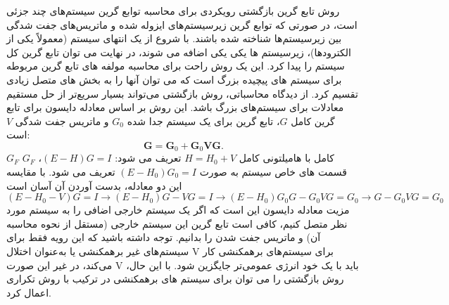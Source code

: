 روش تابع گرین بازگشتی رویکردی برای محاسبه توابع گرین سیستم‌های چند جزئی است، در صورتی که توابع گرین زیرسیستم‌های ایزوله شده و ماتریس‌های جفت شدگی بین زیرسیستم‌ها شناخته شده باشند. با شروع از یک انتهای سیستم (معمولاً یکی از الکترودها)، زیرسیستم ها یکی یکی اضافه می شوند، در نهایت می توان تابع گرین کل سیستم را پیدا کرد. این یک روش راحت برای محاسبه مولفه های تابع گرین مربوطه برای سیستم های پیچیده بزرگ است که می توان آنها را به بخش های متصل زیادی تقسیم کرد. از دیدگاه محاسباتی، روش بازگشتی می‌تواند بسیار سریع‌تر از حل مستقیم معادلات برای سیستم‌های بزرگ باشد.
این روش بر اساس معادله دایسون برای تابع گرین کامل $G$، تابع گرین برای یک سیستم جدا شده $G_0$ و ماتریس جفت شدگی $V$ است:
\begin{equation}
    \mathbf{G}={{\mathbf{G}}_{0}}+{{\mathbf{G}}_{0}}\mathbf{VG}.
\end{equation}
$G_F$ کامل با هامیلتونی کامل $H = H_0 + V$ تعریف می شود: $(E - H) G = I$، $G_F$ قسمت های خاص سیستم به صورت $(E - H_0) G_0 = I$ تعریف می شود. با مقایسه این دو معادله، بدست آوردن آن آسان است$\left(E-H_0-V\right)G=I\rightarrow\left(E-H_0\right)G-VG=I\rightarrow\left(E-H_0\right)G_0G-G_0VG=G_0\rightarrow G-G_0VG=G_0$
مزیت معادله دایسون این است که اگر یک سیستم خارجی اضافی را به سیستم مورد نظر متصل کنیم، کافی است تابع گرین این سیستم خارجی (مستقل از نحوه محاسبه آن) و ماتریس جفت شدن را بدانیم. توجه داشته باشید که این رویه فقط برای سیستم‌های غیر برهمکنشی یا به‌عنوان اختلال V برای سیستم‌های برهمکنشی کار می‌کند، در غیر این صورت V باید با یک خود انرژی عمومی‌تر جایگزین شود. با این حال، روش بازگشتی را می توان برای سیستم های برهمکنشی در ترکیب با روش تکراری اعمال کرد.

